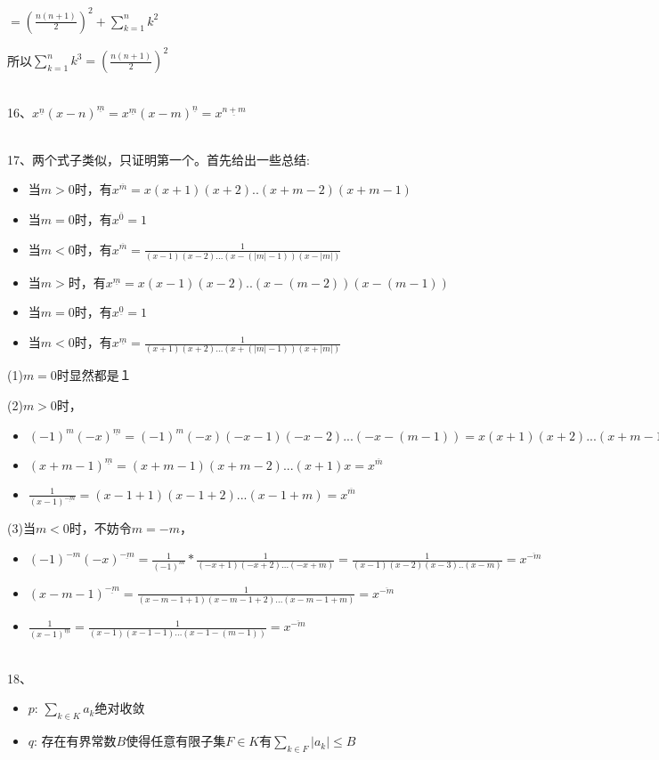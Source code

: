\documentclass[onecolumn]{article}
\begin{document}
$=(\frac{n(n+1)}{2})^{2}+\sum_{k=1}^{n}k^{2}$\par
所以$\sum_{k=1}^{n}k^{3}=(\frac{n(n+1)}{2})^{2}$\par
~\\
16、$x^{\underline{n}}(x-n)^{\underline{m}}=x^{\underline{m}}(x-m)^{\underline{n}}=x^{\underline{n+m}}$ \par
~\\
17、两个式子类似，只证明第一个。首先给出一些总结:\par
\begin{itemize}
	\item 当$m>0$时，有$x^{\overline{m}}=x(x+1)(x+2)..(x+m-2)(x+m-1)$
	\item 当$m=0$时，有$x^{\overline{0}}=1$
	\item 当$m<0$时，有$x^{\overline{m}}=\frac{1}{(x-1)(x-2)...(x-(|m|-1))(x-|m|)}$
	\item 当$m>$时，有$x^{\underline{m}}=x(x-1)(x-2)..(x-(m-2))(x-(m-1))$
	\item 当$m=0$时，有$x^{\underline{0}}=1$
	\item 当$m<0$时，有$x^{\underline{m}}=\frac{1}{(x+1)(x+2)...(x+(|m|-1))(x+|m|)}$
\end{itemize}
 (1)$m=0$时显然都是１ \par
 (2)$m>0$时，
\begin{itemize}
	\item $(-1)^{m}(-x)^{\underline{m}}=(-1)^{m}(-x)(-x-1)(-x-2)...(-x-(m-1))=x(x+1)(x+2)...(x+m-1)=x^{\overline{m}}$
	\item $(x+m-1)^{\underline{m}}=(x+m-1)(x+m-2)...(x+1)x=x^{\overline{m}}$
	\item $\frac{1}{(x-1)^{\underline{-m}}}=(x-1+1)(x-1+2)...(x-1+m)=x^{\overline{m}}$
\end{itemize}
(3)当$m<0$时，不妨令$m=-m$，
\begin{itemize}
	\item $(-1)^{-m}(-x)^{\underline{-m}}=\frac{1}{(-1)^{m}}*\frac{1}{(-x+1)(-x+2)...(-x+m)}=\frac{1}{(x-1)(x-2)(x-3)..(x-m)}=x^{\overline{-m}}$
	\item $(x-m-1)^{\underline{-m}}=\frac{1}{(x-m-1+1)(x-m-1+2)...(x-m-1+m)}=x^{\overline{-m}}$
	\item $\frac{1}{(x-1)^{\underline{m}}}=\frac{1}{(x-1)(x-1-1)...(x-1-(m-1))}=x^{\overline{-m}}$
\end{itemize}
~\\
18、
\begin{itemize}
	\item $p$: $\sum_{k \in K}a_{k}$绝对收敛
	\item $q$: 存在有界常数$B$使得任意有限子集$F \in K$有$\sum_{k \in F}|a_{k}| \leq B$
\end{itemize}
\end{document}
